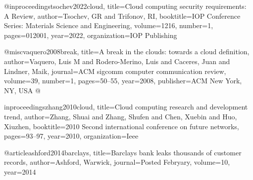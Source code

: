 @inproceedings{tsochev2022cloud,
  title={Cloud computing security requirements: A Review},
  author={Tsochev, GR and Trifonov, RI},
  booktitle={IOP Conference Series: Materials Science and Engineering},
  volume={1216},
  number={1},
  pages={012001},
  year={2022},
  organization={IOP Publishing}
}















@misc{vaquero2008break,
  title={A break in the clouds: towards a cloud definition},
  author={Vaquero, Luis M and Rodero-Merino, Luis and Caceres, Juan and Lindner, Maik},
  journal={ACM sigcomm computer communication review},
  volume={39},
  number={1},
  pages={50--55},
  year={2008},
  publisher={ACM New York, NY, USA}
}
@





inproceedings{zhang2010cloud,
  title={Cloud computing research and development trend},
  author={Zhang, Shuai and Zhang, Shufen and Chen, Xuebin and Huo, Xiuzhen},
  booktitle={2010 Second international conference on future networks},
  pages={93--97},
  year={2010},
  organization={Ieee}
}









@article{ashford2014barclays,
  title={Barclays bank leaks thousands of customer records},
  author={Ashford, Warwick},
  journal={Posted Febryary},
  volume={10},
  year={2014}
}


